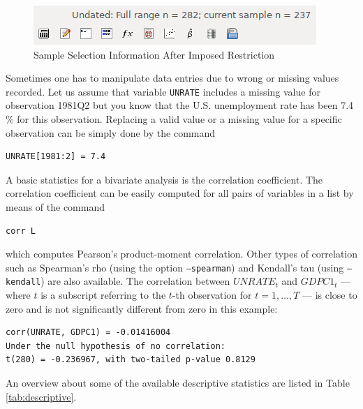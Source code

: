 \documentclass[11pt]{article}
\begin{document}
\begin{figure}[!h]
	\centering
	\includegraphics[width=.42\textwidth]{../figures/smpl_restrict}
	\caption{Sample Selection Information After Imposed Restriction}
	\label{fig:smpl}
\end{figure}

Sometimes one has to manipulate data entries due to wrong or missing values recorded. Let us assume that variable \texttt{UNRATE} includes a missing value for observation 1981Q2 but you know that the U.S. unemployment rate has been 7.4 \% for this observation. Replacing a valid value or a missing value for a specific observation can be simply done by the command
\begin{Verbatim}[baselinestretch=0.75, fontsize=\small]
UNRATE[1981:2] = 7.4
\end{Verbatim}

A basic statistics for a bivariate analysis is the correlation coefficient. The correlation coefficient can be easily computed for all pairs of variables in a list by means of the command
\begin{Verbatim}[baselinestretch=0.75, fontsize=\small]
corr L
\end{Verbatim}
which computes Pearson's product-moment correlation. Other types of correlation such as Spearman's rho (using the option \texttt{---spearman}) and Kendall's tau (using \texttt{---kendall}) are also available. The correlation between $UNRATE_t$ and $GDPC1_t$ --- where $ t $ is a subscript referring to the $ t $-th observation for $ t=1,\ldots, T $ --- is close to zero and is not significantly different from zero in this example:
\begin{Verbatim}[baselinestretch=0.75, fontsize=\small]
corr(UNRATE, GDPC1) = -0.01416004
Under the null hypothesis of no correlation:
t(280) = -0.236967, with two-tailed p-value 0.8129
\end{Verbatim}

An overview about some of the available descriptive statistics are listed in Table \ref{tab:descriptive}.
\end{document}
